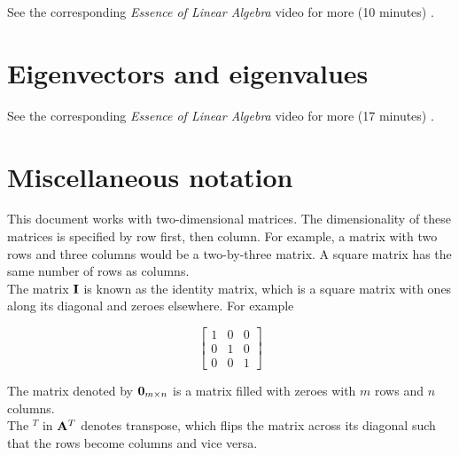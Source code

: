 See the corresponding \textit{Essence of Linear Algebra} video for more (10
minutes) \cite{bib:linalg_the_determinant}.

\section{Eigenvectors and eigenvalues}

See the corresponding \textit{Essence of Linear Algebra} video for more (17
minutes) \cite{bib:linalg_eigenvectors_and_eigenvalues}.

\section{Miscellaneous notation}

This document works with two-dimensional matrices. The dimensionality of these
matrices is specified by row first, then column. For example, a matrix with two
rows and three columns would be a two-by-three matrix. A square matrix has the
same number of rows as columns. \\

The matrix $\mathbf{I}$ is known as the identity matrix, which is a square matrix
with ones along its diagonal and zeroes elsewhere. For example

\begin{equation*}
  \left[
  \begin{array}{ccc}
    1 & 0 & 0 \\
    0 & 1 & 0 \\
    0 & 0 & 1
  \end{array}
  \right]
\end{equation*}

\noindent The matrix denoted by $\mathbf{0}_{m \times n}$ is a matrix filled with
zeroes with $m$ rows and $n$ columns. \\

The $^T$ in $\mathbf{A}^T$ denotes transpose, which flips the matrix across its
diagonal such that the rows become columns and vice versa.
